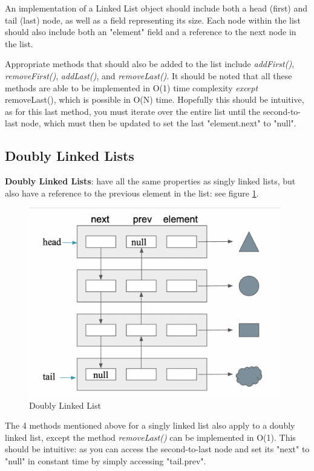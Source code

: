 \documentclass[12pt]{article}
\begin{document}
An implementation of a Linked List object should include both a head (first) and tail (last) node, as well as a field representing its size. Each node within the list should also include both an "element" field and a reference to the next node in the list.  

Appropriate methods that should also be added to the list include \textit{addFirst()}, \textit{removeFirst()}, \textit{addLast()}, and \textit{removeLast()}. It should be noted that all these methods are able to be implemented in O(1) time complexity \textit{except} removeLast(), which is possible in O(N) time. Hopefully this should be intuitive, as for this last method, you must iterate over the entire list until the second-to-last node, which must then be updated to set the last "element.next" to "null".

\subsection{Doubly Linked Lists}
\textbf{Doubly Linked Lists}: have all the same properties as singly linked lists, but also have a reference to the previous element in the list: see figure \ref{fig:doublylinked}.

\begin{figure}[!ht]
    \centering
    \includegraphics[width=11cm]{misc/doublylinkedlist.png}
    \caption{Doubly Linked List}
    \label{fig:doublylinked}
\end{figure}

The 4 methods mentioned above for a singly linked list also apply to a doubly linked list, except the method \textit{removeLast()} can be implemented in O(1). This should be intuitive: as you can access the second-to-last node and set its "next" to "null" in constant time by simply accessing "tail.prev".
\end{document}
